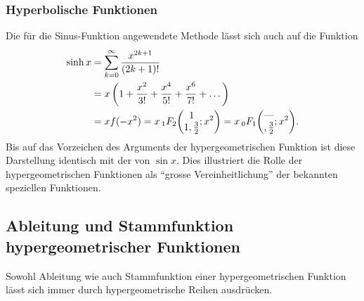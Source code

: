 \subsubsection{Hyperbolische Funktionen}
Die für die Sinus-Funktion angewendete Methode lässt sich auch
auf die Funktion 
\begin{align*}
\sinh x
&=
\sum_{k=0}^\infty \frac{x^{2k+1}}{(2k+1)!}
\\
&=
x
\,
\biggl(
1+\frac{x^2}{3!} + \frac{x^4}{5!}+\frac{x^6}{7!}+\dots
\biggr)
\\
&=
xf(-x^2)
=
x\,\mathstrut_1F_2\biggl(
\begin{matrix}1\\1,\frac{3}{2}\end{matrix}
;x^2
\biggr)
=
x\,\mathstrut_0F_1\biggl(
\begin{matrix}\text{---}\\,\frac{3}{2}\end{matrix}
;x^2
\biggr).
\end{align*}
Bis auf das Vorzeichen des Arguments der hypergeometrischen Funktion
ist diese Darstellung identisch mit der von $\sin x$.
Dies illustriert die Rolle der hypergeometrischen Funktionen als
``grosse Vereinheitlichung'' der bekannten speziellen Funktionen.

%
%
\subsection{Ableitung und Stammfunktion hypergeometrischer Funktionen}
Sowohl Ableitung wie auch Stammfunktion einer hypergeometrischen
Funktion lässt sich immer durch hypergeometrische Reihen ausdrücken.


